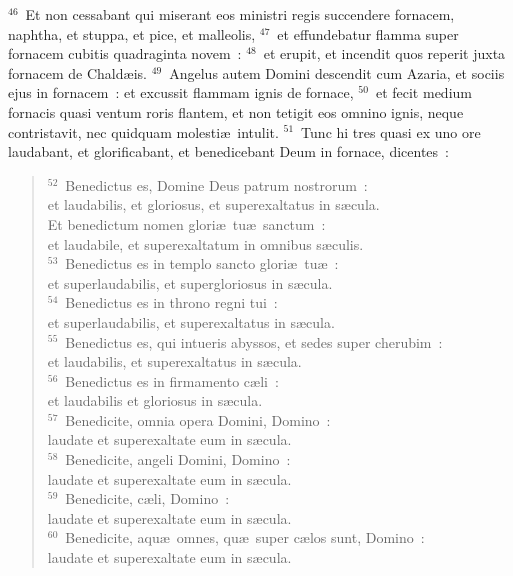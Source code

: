 ${}^{46}$~Et non cessabant qui miserant eos ministri regis succendere fornacem, naphtha, et stuppa, et pice, et malleolis,
${}^{47}$~et effundebatur flamma super fornacem cubitis quadraginta novem~:
${}^{48}$~et erupit, et incendit quos reperit juxta fornacem de Chald\ae is.
${}^{49}$~Angelus autem Domini descendit cum Azaria, et sociis ejus in fornacem~: et excussit flammam ignis de fornace,
${}^{50}$~et fecit medium fornacis quasi ventum roris flantem, et non tetigit eos omnino ignis, neque contristavit, nec quidquam molesti\ae\ intulit.
${}^{51}$~Tunc hi tres quasi ex uno ore laudabant, et glorificabant, et benedicebant Deum in fornace, dicentes~:
\begin{flushleft}\begin{verse}${}^{52}$~Benedictus es, Domine Deus patrum nostrorum~:\\ et laudabilis, et gloriosus, et superexaltatus in s\ae cula.\\ Et benedictum nomen glori\ae\ tu\ae\ sanctum~:\\ et laudabile, et superexaltatum in omnibus s\ae culis.\\
${}^{53}$~Benedictus es in templo sancto glori\ae\ tu\ae~:\\ et superlaudabilis, et supergloriosus in s\ae cula.\\
${}^{54}$~Benedictus es in throno regni tui~:\\ et superlaudabilis, et superexaltatus in s\ae cula.\\
${}^{55}$~Benedictus es, qui intueris abyssos, et sedes super cherubim~:\\ et laudabilis, et superexaltatus in s\ae cula.\\
${}^{56}$~Benedictus es in firmamento c\ae li~:\\ et laudabilis et gloriosus in s\ae cula.\\
${}^{57}$~Benedicite, omnia opera Domini, Domino~:\\ laudate et superexaltate eum in s\ae cula.\\
${}^{58}$~Benedicite, angeli Domini, Domino~:\\ laudate et superexaltate eum in s\ae cula.\\
${}^{59}$~Benedicite, c\ae li, Domino~:\\ laudate et superexaltate eum in s\ae cula.\\
${}^{60}$~Benedicite, aqu\ae\ omnes, qu\ae\ super c\ae los sunt, Domino~:\\ laudate et superexaltate eum in s\ae cula.\\

\end{verse}
\end{flushleft}
